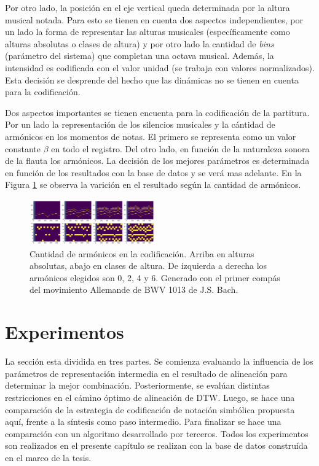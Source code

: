 \documentclass
  [ams,pdfout]%
	{aeslac}
\begin{document}
Por otro lado, la posición en el eje vertical queda determinada por la altura musical notada. Para esto se tienen en cuenta dos aspectos independientes, por un lado la forma de representar las alturas musicales (específicamente como alturas absolutas o clases de altura) y por otro lado la cantidad de \textit{bins} (parámetro del sistema) que completan una octava musical. Además, la intensidad es codificada con el valor unidad (se trabaja con valores normalizados). Esta decisión se desprende del hecho que las dinámicas no se tienen en cuenta para la codificación. 

Dos aspectos importantes se tienen encuenta para la codificación de la partitura. Por un lado la representación de los silencios musicales y la cántidad de armónicos en los momentos de notas. El primero se representa como un valor constante $\beta$ en todo el registro. Del otro lado, en función de la naturaleza sonora de la flauta los armónicos. La decisión de los mejores parámetros es determinada en función de los resultados con la base de datos y se verá mas adelante. En la Figura \ref{fig:armonicos_param} se observa la varición en el resultado según la cantidad de armónicos.

\begin{figure}[h!]
\begin{center}
\includegraphics[width=0.48\textwidth]{imagenes/armonicos_param} 	
\caption{Cantidad de armónicos en la codificación. Arriba en alturas absolutas, abajo en clases de altura. De izquierda a derecha los armónicos elegidos son 0, 2, 4 y 6. Generado con el primer compás del movimiento Allemande de BWV 1013 de J.S. Bach.}
\label{fig:armonicos_param}
\end{center}
\end{figure}

\section{Experimentos}

La sección esta dividida en tres partes. Se comienza evaluando la influencia de los parámetros de representación intermedia en el resultado de alineación para determinar la mejor combinación. Posteriormente, se evalúan distintas restricciones en el cámino óptimo de alineación de DTW. Luego, se hace una comparación de la estrategia de codificación de notación simbólica propuesta aquí, frente a la síntesis como paso intermedio. Para finalizar se hace una comparación con un algoritmo desarrollado por terceros. Todos los experimentos son realizados en el presente capítulo se realizan con la base de datos construída en el marco de la tesis. 
\end{document}
